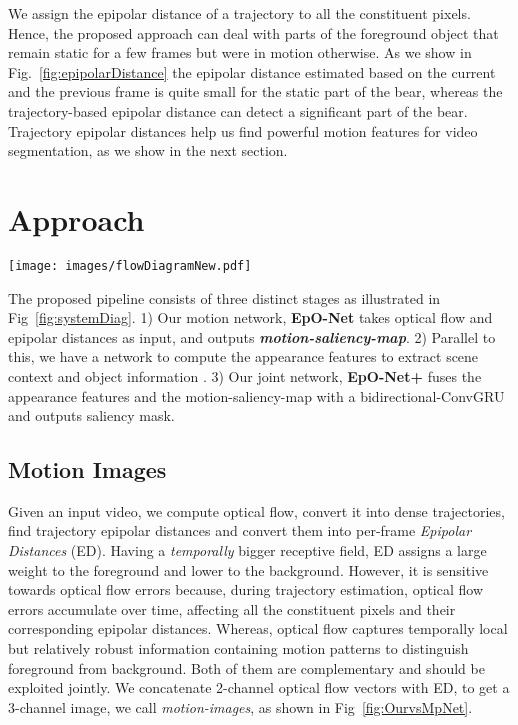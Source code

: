 \documentclass[10pt,twocolumn,letterpaper]{article}
\newcommand{\rowSpace}{\vspace{-0.4cm}}
\begin{document}
We assign the epipolar distance of a trajectory to all the constituent pixels. Hence, the proposed approach can deal with parts of the foreground object that remain static for a few frames but were in motion otherwise. As we show in Fig.~\ref{fig:epipolarDistance} the epipolar distance estimated based on the current and the previous frame is quite small for the static part of the bear, whereas the trajectory-based epipolar distance can detect a significant part of the bear. Trajectory epipolar distances help us find powerful motion features for video segmentation, as we show in the next section.

 
\section{Approach}
\begin{figure*}    
\center
\rowSpace
\texttt{[image: images/flowDiagramNew.pdf]}
\caption{Flow diagram depicting different parts \& information transition in the algorithm. Top Row: steps to compute the motion trajectories \& Epipolar Distance. Bottom row: (Left) Deep-Lab based Appearance Network trained to compute the Appearance Features. (Right) Motion-Images (Optical Flow \& Epipolar Distance) fed to EpO, which outputs motion saliency map. (Middle) Motion-saliency map concatenated with appearance features are fed into the bidirectional convGRU.}
\rowSpace
\label{fig:systemDiag}
\end{figure*}

The proposed pipeline consists of three distinct stages as illustrated in Fig~\ref{fig:systemDiag}. 1) Our motion network, \textbf{EpO-Net} takes optical flow and epipolar distances as input, and outputs \textit{\textbf{motion-saliency-map}}. 2) Parallel to this, we have a network to compute the appearance features to extract scene context and object information \cite{deeplab}. 3) Our joint network, \textbf{EpO-Net+} fuses the appearance features and the motion-saliency-map with a bidirectional-ConvGRU and outputs saliency mask. 

\subsection{Motion Images}
Given an input video, we compute optical flow, convert it into dense trajectories, find trajectory epipolar distances and convert them into per-frame \textit{Epipolar Distances} (ED).
Having a \textit{temporally} bigger receptive field, ED assigns a large weight to the foreground and lower to the background. 
However, it is sensitive towards optical flow errors because, during trajectory estimation, optical flow errors accumulate over time, affecting all the constituent pixels and their corresponding epipolar distances.
Whereas, optical flow captures temporally local but relatively robust information containing motion patterns to distinguish foreground from background. Both of them are complementary and should be exploited jointly. We concatenate 2-channel optical flow vectors with ED, to get a 3-channel image, we call \textit{motion-images}, as shown in Fig~\ref{fig:OurvsMpNet}.
\end{document}
